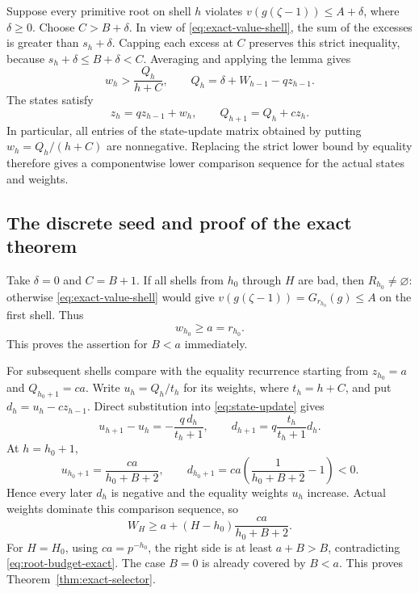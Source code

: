 Suppose every primitive root on shell $h$ violates
$v(g(\zeta-1))\leq A+\delta$, where $\delta\geq0$.
Choose $C>B+\delta$.  In view of \eqref{eq:exact-value-shell}, the
sum of the excesses is greater than $s_h+\delta$.  Capping each
excess at $C$ preserves this strict inequality, because
$s_h+\delta\leq B+\delta<C$.  Averaging and applying the lemma gives
\begin{equation}\label{eq:failure-recurrence-input}
 w_h>\frac{Q_h}{h+C},\qquad
 Q_h=\delta+W_{h-1}-qz_{h-1}.
\end{equation}
The states satisfy
\begin{equation}\label{eq:state-update}
 z_h=qz_{h-1}+w_h,\qquad Q_{h+1}=Q_h+c z_h.
\end{equation}
In particular, all entries of the state-update matrix obtained by
putting $w_h=Q_h/(h+C)$ are nonnegative.  Replacing the strict lower
bound by equality therefore gives a componentwise lower comparison
sequence for the actual states and weights.

\subsection{The discrete seed and proof of the exact theorem}

Take $\delta=0$ and $C=B+1$.  If all shells from $h_0$ through $H$
are bad, then $R_{h_0}\ne\varnothing$: otherwise
\eqref{eq:exact-value-shell} would give
$v(g(\zeta-1))=G_{r_{h_0}}(g)\leq A$ on the first shell.  Thus
\[
                  w_{h_0}\geq a=r_{h_0}.
\]
This proves the assertion for $B<a$ immediately.

For subsequent shells compare with the equality recurrence starting
from $z_{h_0}=a$ and $Q_{h_0+1}=ca$.  Write $u_h=Q_h/t_h$ for its
weights, where $t_h=h+C$, and put
$d_h=u_h-cz_{h-1}$.  Direct substitution into
\eqref{eq:state-update} gives
\begin{equation}\label{eq:defect-recurrence}
 u_{h+1}-u_h=-\frac{q\,d_h}{t_h+1},\qquad
 d_{h+1}=q\frac{t_h}{t_h+1}d_h.
\end{equation}
At $h=h_0+1$,
\[
 u_{h_0+1}=\frac{ca}{h_0+B+2},\qquad
 d_{h_0+1}=ca\left(\frac1{h_0+B+2}-1\right)<0.
\]
Hence every later $d_h$ is negative and the equality weights $u_h$
increase.  Actual weights dominate this comparison sequence, so
\[
 W_H\geq a+(H-h_0)\frac{ca}{h_0+B+2}.
\]
For $H=H_0$, using $ca=p^{-h_0}$, the right side is at least $a+B>B$, contradicting
\eqref{eq:root-budget-exact}.  The case $B=0$ is already covered by
$B<a$.  This proves Theorem~\ref{thm:exact-selector}.

